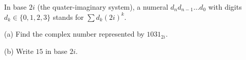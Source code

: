 In base $2i$ (the quater-imaginary system), a numeral $d_nd_{n-1}\dots d_0$ with digits $d_k\in\{0,1,2,3\}$ stands for $\sum d_k(2i)^k$.

(a) Find the complex number represented by $1031_{2i}$.

(b) Write $15$ in base $2i$.
